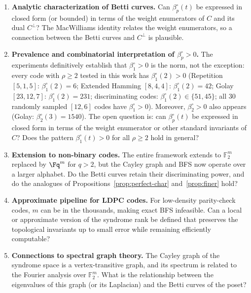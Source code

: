 \documentclass[11pt,twoside,leqno]{article}
\theoremstyle{definition}
\theoremstyle{plain}
\theoremstyle{remark}
\newcommand{\Ftwo}{\mathbb{F}_2}
\newcommand{\covrad}{\rho}
\begin{document}
\begin{enumerate}[leftmargin=*,itemsep=3pt]
\item \textbf{Analytic characterization of Betti curves.}
  Can $\beta_p^\circ(t)$ be expressed in closed form (or bounded) in terms of the weight
  enumerators of $C$ and its dual $C^\perp$? The MacWilliams identity relates the weight
  enumerators, so a connection between the Betti curves and $C^\perp$ is plausible.

\item \textbf{Prevalence and combinatorial interpretation of $\beta_p^\circ>0$.}
  The experiments definitively establish that $\beta_1^\circ>0$ is the norm, not the exception:
  every code with $\covrad\ge 2$ tested in this work has $\beta_1^\circ(2)>0$ (Repetition $[5,1,5]$:
  $\beta_1^\circ(2)=6$; Extended Hamming $[8,4,4]$: $\beta_1^\circ(2)=42$; Golay $[23,12,7]$:
  $\beta_1^\circ(2)=231$; discriminating codes: $\beta_1^\circ(2)\in\{51,45\}$; all 30 randomly
  sampled $[12,6]$ codes have $\beta_1^\circ>0$). Moreover, $\beta_2^\circ>0$ also appears (Golay:
  $\beta_2^\circ(3)=1540$). The open question is: can $\beta_p^\circ(t)$ be expressed in closed
  form in terms of the weight enumerator or other standard invariants of $C$? Does the pattern
  $\beta_1^\circ(t)>0$ for all $\covrad\ge 2$ hold in general?

\item \textbf{Extension to non-binary codes.}
  The entire framework extends to $\Ftwo^m$ replaced by $\Fq^m$ for $q>2$, but the Cayley
  graph and BFS now operate over a larger alphabet. Do the Betti curves retain their
  discriminating power, and do the analogues of Propositions~\ref{prop:perfect-char}
  and~\ref{prop:finer} hold?

\item \textbf{Approximate pipeline for LDPC codes.}
  For low-density parity-check codes, $m$ can be in the thousands, making exact BFS
  infeasible. Can a local or approximate version of the syndrome rank be defined that
  preserves the topological invariants up to small error while remaining efficiently computable?

\item \textbf{Connections to spectral graph theory.}
  The Cayley graph of the syndrome space is a vertex-transitive graph, and its spectrum
  is related to the Fourier analysis over $\Ftwo^m$. What is the relationship between
  the eigenvalues of this graph (or its Laplacian) and the Betti curves of the poset?
\end{enumerate}
\end{document}
